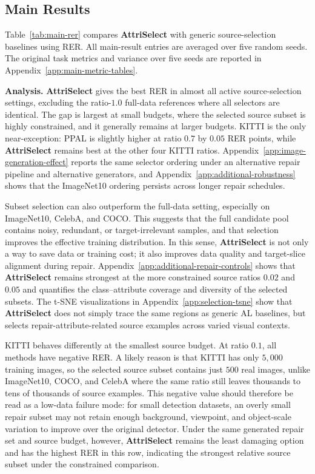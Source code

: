 \documentclass{article}
\newcommand{\modelname}{AttriSelect}
\newcommand{\model}{\textcolor{darkteal}{\textbf{\modelname}}\xspace}
\begin{document}
\subsection{Main Results}

Table~\ref{tab:main-rer} compares \model with generic source-selection baselines using RER. All main-result entries are averaged over five random seeds. The original task metrics and variance over five seeds are reported in Appendix~\ref{app:main-metric-tables}.

\noindent\textbf{Analysis.} \model gives the best RER in almost all active source-selection settings, excluding the ratio-$1.0$ full-data references where all selectors are identical. The gap is largest at small budgets, where the selected source subset is highly constrained, and it generally remains at larger budgets. KITTI is the only near-exception: PPAL is slightly higher at ratio $0.7$ by $0.05$ RER points, while \model remains best at the other four KITTI ratios. Appendix~\ref{app:image-generation-effect} reports the same selector ordering under an alternative repair pipeline and alternative generators, and Appendix~\ref{app:additional-robustness} shows that the ImageNet10 ordering persists across longer repair schedules.

Subset selection can also outperform the full-data setting, especially on ImageNet10, CelebA, and COCO. This suggests that the full candidate pool contains noisy, redundant, or target-irrelevant samples, and that selection improves the effective training distribution. In this sense, \model is not only a way to save data or training cost; it also improves data quality and target-slice alignment during repair. Appendix~\ref{app:additional-repair-controls} shows that \model remains strongest at the more constrained source ratios $0.02$ and $0.05$ and quantifies the class--attribute coverage and diversity of the selected subsets. The t-SNE visualizations in Appendix~\ref{app:selection-tsne} show that \model does not simply trace the same regions as generic AL baselines, but selects repair-attribute-related source examples across varied visual contexts.

KITTI behaves differently at the smallest source budget. At ratio $0.1$, all methods have negative RER. A likely reason is that KITTI has only $5{,}000$ training images, so the selected source subset contains just $500$ real images, unlike ImageNet10, COCO, and CelebA where the same ratio still leaves thousands to tens of thousands of source examples. This negative value should therefore be read as a low-data failure mode: for small detection datasets, an overly small repair subset may not retain enough background, viewpoint, and object-scale variation to improve over the original detector. Under the same generated repair set and source budget, however, \model remains the least damaging option and has the highest RER in this row, indicating the strongest relative source subset under the constrained comparison.
\end{document}
